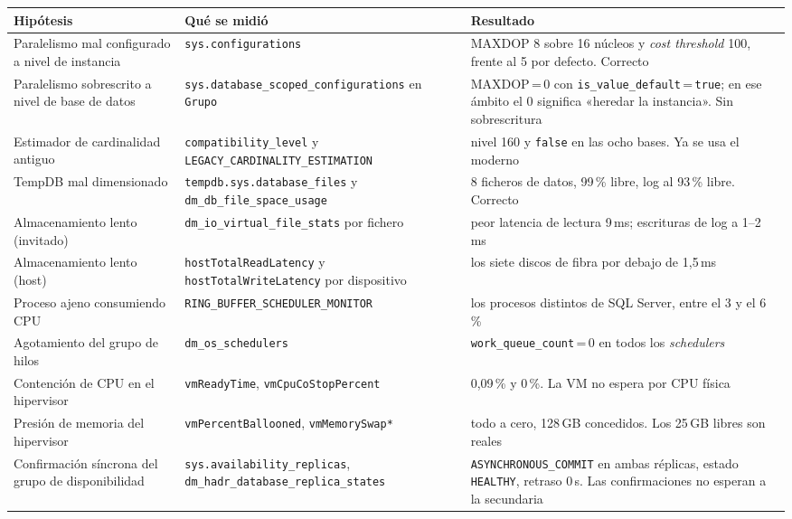 \documentclass[11pt,a4paper]{article}
\newcommand{\cod}[1]{\texttt{\small #1}}
\begin{document}
\begin{longtable}{p{4.3cm}p{5.2cm}p{5.2cm}}
\toprule
\textbf{Hipótesis} & \textbf{Qué se midió} & \textbf{Resultado} \\
\midrule
\endhead
Paralelismo mal configurado a nivel de instancia
  & \cod{sys.configurations}
  & MAXDOP 8 sobre 16 núcleos y \emph{cost threshold} 100, frente al 5 por
    defecto. Correcto \\
Paralelismo sobrescrito a nivel de base de datos
  & \cod{sys.database\_scoped\_configu\-rations} en \cod{Grupo}
  & MAXDOP\,=\,0 con \cod{is\_value\_default}\,=\,\cod{true}; en ese ámbito el
    0 significa «heredar la instancia». Sin sobrescritura \\
Estimador de cardinalidad antiguo
  & \cod{compatibility\_level} y \cod{LEGACY\_CARDINALITY\_ESTIMATION}
  & nivel 160 y \cod{false} en las ocho bases. Ya se usa el moderno \\
TempDB mal dimensionado
  & \cod{tempdb.sys.database\_files} y \cod{dm\_db\_file\_space\_usage}
  & 8 ficheros de datos, 99\,\% libre, log al 93\,\% libre. Correcto \\
Almacenamiento lento (invitado)
  & \cod{dm\_io\_virtual\_file\_stats} por fichero
  & peor latencia de lectura 9\,ms; escrituras de log a 1--2\,ms \\
Almacenamiento lento (host)
  & \cod{hostTotalReadLatency} y \cod{hostTotalWriteLatency} por dispositivo
  & los siete discos de fibra por debajo de 1,5\,ms \\
Proceso ajeno consumiendo CPU
  & \cod{RING\_BUFFER\_SCHEDULER\_MONITOR}
  & los procesos distintos de SQL Server, entre el 3 y el 6\,\% \\
Agotamiento del grupo de hilos
  & \cod{dm\_os\_schedulers}
  & \cod{work\_queue\_count}\,=\,0 en todos los \emph{schedulers} \\
Contención de CPU en el hipervisor
  & \cod{vmReadyTime}, \cod{vmCpuCoStopPercent}
  & 0,09\,\% y 0\,\%. La VM no espera por CPU física \\
Presión de memoria del hipervisor
  & \cod{vmPercentBallooned}, \cod{vmMemorySwap*}
  & todo a cero, 128\,GB concedidos. Los 25\,GB libres son reales \\
Confirmación síncrona del grupo de disponibilidad
  & \cod{sys.availability\_replicas}, \cod{dm\_hadr\_database\_replica\_states}
  & \cod{ASYNCHRONOUS\_COMMIT} en ambas réplicas, estado \cod{HEALTHY},
    retraso 0\,s. Las confirmaciones no esperan a la secundaria \\
\bottomrule
\end{longtable}
\end{document}
